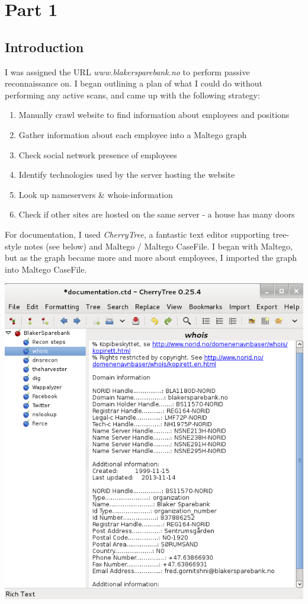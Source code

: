\section{Part 1}

\subsection{Introduction}
I was assigned the URL \textit{www.blakersparebank.no} to perform passive reconnaissance on. I began outlining a plan of what I could do without performing any active scans, and came up with the following strategy:

\begin{enumerate}
	\item Manually crawl website to find information about employees and positions
	\item Gather information about each employee into a Maltego graph
	\item Check social network presence of employees
	\item Identify technologies used by the server hosting the website
	\item Look up nameservers \& whois-information
	\item Check if other sites are hosted on the same server - a house has many doors
\end{enumerate}

For documentation, I used \textit{CherryTree}, a fantastic text editor supporting tree-style notes (see below) and Maltego / Maltego CaseFile. I began with Maltego, but as the graph became more and more about employees, I imported the graph into Maltego CaseFile.

\includegraphics[scale=0.7]{cherrytree.png}\\

